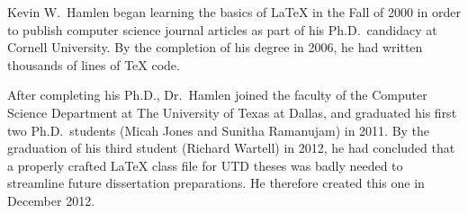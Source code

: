 \documentclass[doublespacing]{utdthesis}
\begin{document}
\begin{biosketch}
Kevin W.~Hamlen began learning the basics of \LaTeX{} in the Fall of 2000 in
order to publish computer science journal articles as part of his
Ph.D.~candidacy at Cornell University.
By the completion of his degree in 2006, he had written thousands of lines of
\TeX{} code.

After completing his Ph.D., Dr.~Hamlen joined the faculty of the Computer
Science Department at The University of Texas at Dallas, and graduated his
first two Ph.D.~students (Micah Jones and Sunitha Ramanujam) in 2011.
By the graduation of his third student (Richard Wartell) in 2012, he had
concluded that a properly crafted \LaTeX{} class file for UTD theses was badly
needed to streamline future dissertation preparations.
He therefore created this one in December 2012.
\end{biosketch}


\begin{vita}  %
\end{vita}  %
\end{document}
